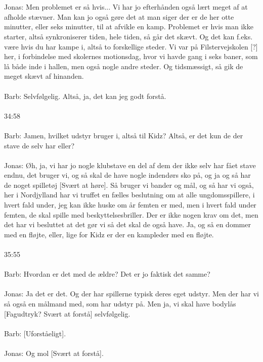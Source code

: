 \\\\
Jonas: Men problemet er så hvis... Vi har jo efterhånden også lært meget af at afholde stævner. Man kan jo også gøre det at man siger der er de her otte minutter, eller seks minutter, til at afvikle en kamp. Problemet er hvis man ikke starter, altså synkroniserer tiden, hele tiden, så går det skævt. Og det kan f.eks. være hvis du har kampe i, altså to forskellige steder. Vi var på Filstervejskolen [?] her, i forbindelse med skolernes motionsdag, hvor vi havde gang i seks baner, som lå både inde i hallen, men også nogle andre steder. Og tidsmæssigt, så gik de meget skævt af hinanden.
\\\\
Barb: Selvfølgelig. Altså, ja, det kan jeg godt forstå.
\\\\
34:58
\\\\
Barb: Jamen, hvilket udstyr bruger i, altså til Kidz? Altså, er det kun de der stave de selv har eller?
\\\\
Jonas: Øh, ja, vi har jo nogle klubstave en del af dem der ikke selv har fået stave endnu, det bruger vi, og så skal de have nogle indendørs sko på, og ja og så har de noget spilletøj [Svært at høre]. Så bruger vi bander og mål, og så har vi også, her i Nordjylland har vi truffet en fælles beslutning om at alle ungdomsspillere, i hvert fald under, jeg kan ikke huske om år femten er med, men i hvert fald under femten, de skal spille med beskyttelsesbriller. Der er ikke nogen krav om det, men det har vi besluttet at det gør vi så det skal de også have. Ja, og så en dommer med en fløjte, eller, lige for Kidz er der en kampleder med en fløjte.
\\\\
35:55
\\\\
Barb: Hvordan er det med de ældre? Det er jo faktisk det samme?
\\\\
Jonas: Ja det er det. Og der har spillerne typisk deres eget udstyr. Men der har vi så også en målmand med, som har udstyr på. Men ja, vi skal have bodylås [Fagudtryk? Svært at forstå] selvfølgelig.
\\\\
Barb: [Uforståeligt].
\\\\
Jonas: Og mol [Svært at forstå].
\\\\
